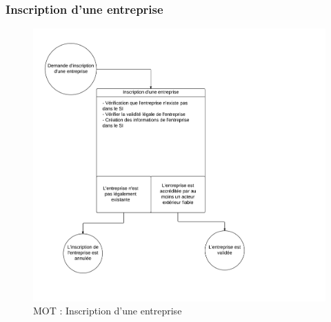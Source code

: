% 
% 

\subsubsection{Inscription d'une entreprise}
\begin{figure}[ht]
    \centering
    \includegraphics[width=\textwidth]{mot-inscription-entreprise}
    \caption{MOT : Inscription d'une entreprise}
    \label{fig:mot-inscription-entreprise}
\end{figure}
\newpage

